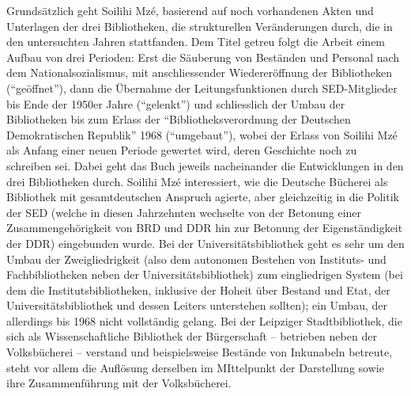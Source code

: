 \documentclass[a4paper,
fontsize=11pt,
oneside,
numbers=noperiodatend,
parskip=half-,
bibliography=totoc,
final
]{scrartcl}
\begin{document}
Grundsätzlich geht Soilihi Mzé, basierend auf noch vorhandenen Akten und
Unterlagen der drei Bibliotheken, die strukturellen Veränderungen durch,
die in den untersuchten Jahren stattfanden. Dem Titel getreu folgt die
Arbeit einem Aufbau von drei Perioden: Erst die Säuberung von Beständen
und Personal nach dem Nationalsozialismus, mit anschliessender
Wiedereröffnung der Bibliotheken (\enquote{geöffnet}), dann die
Übernahme der Leitungsfunktionen durch SED-Mitglieder bis Ende der
1950er Jahre (\enquote{gelenkt}) und schliesslich der Umbau der
Bibliotheken bis zum Erlass der \enquote{Bibliotheksverordnung der
Deutschen Demokratischen Republik} 1968 (\enquote{umgebaut}), wobei der
Erlass von Soilihi Mzé als Anfang einer neuen Periode gewertet wird,
deren Geschichte noch zu schreiben sei. Dabei geht das Buch jeweils
nacheinander die Entwicklungen in den drei Bibliotheken durch. Soilihi
Mzé interessiert, wie die Deutsche Bücherei als Bibliothek mit
gesamtdeutschen Anspruch agierte, aber gleichzeitig in die Politik der
SED (welche in diesen Jahrzehnten wechselte von der Betonung einer
Zusammengehörigkeit von BRD und DDR hin zur Betonung der
Eigenständigkeit der DDR) eingebunden wurde. Bei der
Universitätsbibliothek geht es sehr um den Umbau der Zweigliedrigkeit
(also dem autonomen Bestehen von Instituts- und Fachbibliotheken neben
der Universitätsbibliothek) zum eingliedrigen System (bei dem die
Institutsbibliotheken, inklusive der Hoheit über Bestand und Etat, der
Universitätsbibliothek und dessen Leiters unterstehen sollten); ein
Umbau, der allerdings bis 1968 nicht vollständig gelang. Bei der
Leipziger Stadtbibliothek, die sich als Wissenschaftliche Bibliothek der
Bürgerschaft -- betrieben neben der Volksbücherei -- verstand und
beispielsweise Bestände von Inkunabeln betreute, steht vor allem die
Auflösung derselben im MIttelpunkt der Darstellung sowie ihre
Zusammenführung mit der Volksbücherei.
\end{document}
